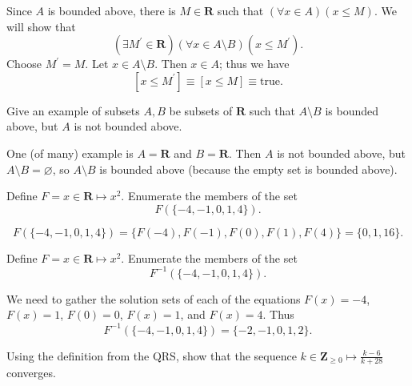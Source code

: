 \documentclass[12pt,fleqn,answers]{exam}
\newcommand{\reals}{\mathbf{R}}
\newcommand{\integers}{\mathbf{Z}}
\newcommand{\true}{\mbox{true}}
\begin{document}
\begin{questions}
\begin{solution}
  Since $A$ is bounded above, there is $M \in \reals$ such that
  $(\forall x \in A)(x \leq M)$.  We will show that
  \[
    (\exists M^\prime \in \reals)(\forall x \in A \setminus B)(x \leq M^\prime).
  \]
  Choose $M^\prime= M$. Let $x \in A \setminus B$. Then $x \in A$; thus we have
  \[
     [x \leq M^\prime]  \equiv [x \leq M] \equiv \true.
  \]


\end{solution}

\question Give an example of subsets $A,B$ be subsets of $\reals$
such that $A \setminus B$ is bounded above, but $A$ is not bounded
above.

\begin{solution}
  One (of many) example is $A = \reals$ and $B = \reals$. Then
  $A$ is not bounded above, but $A \setminus B = \varnothing$,
  so  $A \setminus B$ is bounded above (because the empty set is bounded above).
\end{solution}

\question Define $F = x \in \reals \mapsto x^2$.  Enumerate the members of the set
\begin{equation*}
  F(\{-4,-1,0,1,4 \}).
\end{equation*}
\begin{solution}
  \[
    F(\{-4,-1,0,1,4 \}) = \{F(-4),F(-1),F(0),F(1),F(4) \} =
     \{0,1,16\}.
  \]
\end{solution}
\question Define $F = x \in \reals \mapsto x^2$.  Enumerate the members of the set
\[
      F^{-1}(\{-4,-1,0,1,4 \}).
\]
\begin{solution}
We need to gather the solution sets of each of the
equations $F(x) = -4$, $F(x)=1$, $F(0)=0$, $F(x)=1$, 
and $F(x)=4$.
Thus
\[
  F^{-1}(\{-4,-1,0,1,4 \}) = \{-2,-1,0,1,2\}.
\]
\end{solution}
\question Using the definition from the QRS, show that the sequence 
$k \in \integers_{\geq 0} \mapsto \frac{k-6}{k+28}$ converges.


\end{questions}
\end{document}
